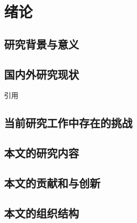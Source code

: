 
\chapter{绪论}

\section{研究背景与意义}
\section{国内外研究现状}
引用\cite{Wang2021ALearning}
\section{当前研究工作中存在的挑战}
\section{本文的研究内容}
\section{本文的贡献和与创新}
\section{本文的组织结构}
